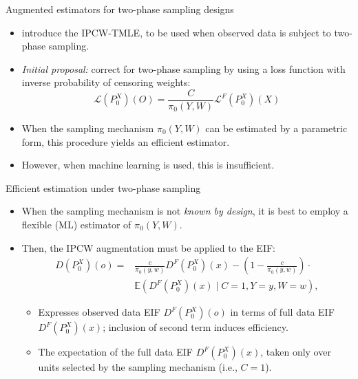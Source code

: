 \documentclass{beamer}
\newcommand{\E}{\mathbb{E}}
\newcommand{\lik}{\mathcal{L}}
\begin{document}

\begin{frame}[c]{Augmented estimators for two-phase sampling designs}

\begin{center}
\begin{itemize}
  \itemsep10pt
  \item \cite{rose2011targeted2sd} introduce the IPCW-TMLE, to be used when
    observed data is subject to two-phase sampling.
  \item \textit{Initial proposal:} correct for two-phase sampling by using a
    loss function with inverse probability of censoring weights:
    \begin{equation*}
      \lik(P_0^X)(O) = \frac{C}{\pi_0(Y, W)}\lik^F(P_0^X)(X)
    \end{equation*}
  \item When the sampling mechanism $\pi_0(Y, W)$ can be estimated by
    a parametric form, this procedure yields an efficient estimator.
  \item However, when machine learning is used, this is insufficient.
\end{itemize}
\end{center}

\note{
}

\end{frame}


\begin{frame}[c]{Efficient estimation under two-phase sampling}

\begin{center}
\begin{itemize}
  \itemsep10pt
  \item When the sampling mechanism is not \textit{known by design}, it is best
    to employ a flexible (ML) estimator of $\pi_0(Y, W)$.
  \item Then, the IPCW augmentation must be applied to the EIF:
    \begin{align*}
      D(P_0^X)(o) = &\frac{c}{\pi_0(y, w)} D^F(P_0^X)(x) - \left(1 -
        \frac{c}{\pi_0(y, w)}\right) \cdot \\ &\E(D^F(P_0^X)(x) \mid
        C = 1, Y = y, W = w),
    \end{align*}
   \begin{itemize}
    \itemsep6pt
     \item Expresses observed data EIF $D^F(P_0^X)(o)$ in terms of full data
       EIF $D^F(P_0^X)(x)$; inclusion of second term induces efficiency.
     \item The expectation of the full data EIF $D^F(P_0^X)(x)$, taken only over
      units selected by the sampling mechanism (i.e., $C = 1$).
  \end{itemize}
\end{itemize}
\end{center}

\note{
}

\end{frame}
\end{document}
